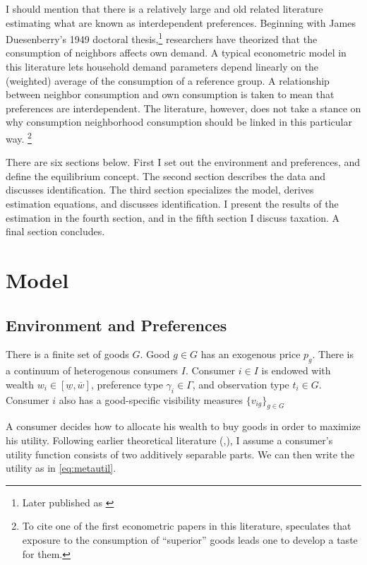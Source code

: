 \documentclass[12pt]{article}
\begin{document}
I should mention that there is a relatively large and old related literature estimating what are known as interdependent preferences.  Beginning with James Duesenberry's 1949 doctoral thesis,\footnote{Later published as \citep{Duesenberry1949}} researchers have theorized that the consumption of neighbors affects own demand.  A typical econometric model in this literature lets household demand parameters depend linearly on the (weighted) average of the consumption of a reference group. A relationship between neighbor consumption and own consumption is taken to mean that preferences are interdependent.  The literature, however, does not take a stance on why consumption neighborhood consumption should be linked in this particular way. \footnote{To cite one of the first econometric papers in this literature, \citet{Pollak1976} speculates that exposure to the consumption of ``superior'' goods leads one to develop a taste for them.}  

There are six sections below.  First I set out the environment and preferences, and define the equilibrium concept.  The second section describes the data and discusses identification.  The third section specializes the model, derives estimation equations, and discusses identification.  I present the results of the estimation in the fourth section, and in the fifth section I discuss taxation.  A final section concludes. 

\section{Model}
\subsection{Environment and Preferences}

There is a finite set of goods $G$.  Good $g \in G$ has an exogenous price $p_g$.  There is a continuum of heterogenous consumers $I$. Consumer $i \in I$ is endowed with wealth $w_i \in \left[ \underline{w},\overline{w} \right]$, preference type $\gamma_i \in \Gamma$, and observation type $t_i \in G$.  Consumer $i$ also has a good-specific visibility measures $\{v_{ig}\}_{g\in G}$

A consumer decides how to allocate his wealth to buy goods in order to maximize his utility.  Following earlier theoretical literature (\citet{Heffetz2011},\citet{Ireland1994}), I assume a consumer's utility function consists of two additively separable parts.  We can then write the utility as in \eqref{eq:metautil}.  
\end{document}
